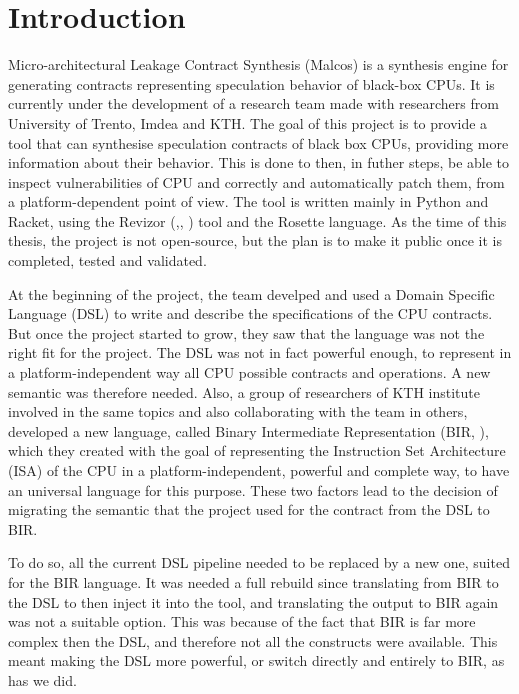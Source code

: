 \chapter{Introduction}
\label{cha:introduction}

Micro-architectural Leakage Contract Synthesis (Malcos) is a synthesis engine
for generating contracts representing speculation behavior of black-box CPUs. It
is currently under the development of a research team made with researchers from
University of Trento, Imdea and KTH. The goal of this project is to provide a tool
that can synthesise speculation contracts of black box CPUs, providing more
information about their behavior. This is done to then, in futher steps, be able
to inspect vulnerabilities of CPU and correctly and automatically patch them,
from a platform-dependent point of view. The tool is written mainly in Python and
Racket, using the Revizor (\cite{article},\cite{repo}, \cite{misc}) tool and the
Rosette language. As the time of this thesis, the project is not open-source,
but the plan is to make it public once it is completed, tested and validated.

At the beginning of the project, the team develped and used a Domain Specific
Language (DSL) to write and describe the specifications of the CPU contracts. But
once the project started to grow, they saw that the language was not the right
fit for the project. The DSL was not in fact powerful enough, to represent in a
platform-independent way all CPU possible contracts and operations. A new semantic
was therefore needed. Also, a group of researchers of KTH institute involved in the
same topics and also collaborating with the team in others, developed a new
language, called Binary Intermediate Representation (BIR, \cite{bir_pub}), which
they created with the goal of representing the Instruction Set Architecture (ISA)
of the CPU in a platform-independent, powerful and complete way, to have an universal
language for this purpose. These two factors lead to the decision of migrating
the semantic that the project used for the contract from the DSL to BIR.

To do so, all the current DSL pipeline needed to be replaced by a new one,
suited for the BIR language. It was needed a full rebuild since translating from
BIR to the DSL to then inject it into the tool, and translating the output to
BIR again was not a suitable option. This was because of the fact that BIR is far
more complex then the DSL, and therefore not all the constructs were available. This
meant making the DSL more powerful, or switch directly and entirely to BIR, as has
we did.

